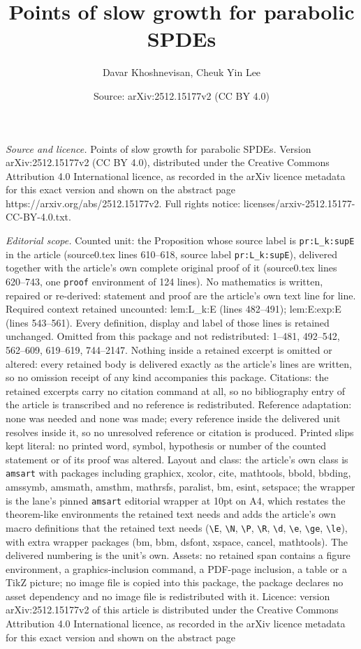 \documentclass[10pt,a4paper]{amsart}
\title[Points of slow growth for parabolic SPDEs]{Points of slow growth for parabolic SPDEs}
\author{Davar Khoshnevisan, Cheuk Yin Lee}
\date{Source: arXiv:2512.15177v2 (CC BY 4.0)}
\begin{document}
\maketitle

\noindent\emph{Source and licence.} Points of slow growth for parabolic SPDEs. Version arXiv:2512.15177v2 (CC BY 4.0), distributed under the Creative Commons Attribution 4.0 International licence, as recorded in the arXiv licence metadata for this exact version and shown on the abstract page https://arxiv.org/abs/2512.15177v2. Full rights notice: licenses/arxiv-2512.15177-CC-BY-4.0.txt.\par\smallskip

\noindent\textit{Editorial scope.} Counted unit: the Proposition whose source label is \texttt{pr:L\_k:supE} in the article (source0.tex lines 610--618, source label \texttt{pr:L\_k:supE}), delivered together with the article's own complete original proof of it (source0.tex lines 620--743, one \texttt{proof} environment of 124 lines). No mathematics is written, repaired or re-derived: statement and proof are the article's own text line for line. Required context retained uncounted: lem:L\_k:E (lines 482--491); lem:E:exp:E (lines 543--561). Every definition, display and label of those lines is retained unchanged. Omitted from this package and not redistributed: 1--481, 492--542, 562--609, 619--619, 744--2147. Nothing inside a retained excerpt is omitted or altered: every retained body is delivered exactly as the article's lines are written, so no omission receipt of any kind accompanies this package. Citations: the retained excerpts carry no citation command at all, so no bibliography entry of the article is transcribed and no reference is redistributed. Reference adaptation: none was needed and none was made; every reference inside the delivered unit resolves inside it, so no unresolved reference or citation is produced. Printed slips kept literal: no printed word, symbol, hypothesis or number of the counted statement or of its proof was altered. Layout and class: the article's own class is \texttt{amsart} with packages including graphicx, xcolor, cite, mathtools, bbold, bbding, amssymb, amsmath, amsthm, mathrsfs, paralist, bm, esint, setspace; the wrapper is the lane's pinned \texttt{amsart} editorial wrapper at 10pt on A4, which restates the theorem-like environments the retained text needs and adds the article's own macro definitions that the retained text needs (\texttt{\textbackslash E}, \texttt{\textbackslash N}, \texttt{\textbackslash P}, \texttt{\textbackslash R}, \texttt{\textbackslash d}, \texttt{\textbackslash e}, \texttt{\textbackslash ge}, \texttt{\textbackslash le}), with extra wrapper packages (bm, bbm, dsfont, xspace, cancel, mathtools). The delivered numbering is the unit's own. Assets: no retained span contains a figure environment, a graphics-inclusion command, a PDF-page inclusion, a table or a TikZ picture; no image file is copied into this package, the package declares no asset dependency and no image file is redistributed with it. Licence: version arXiv:2512.15177v2 of this article is distributed under the Creative Commons Attribution 4.0 International licence, as recorded in the arXiv licence metadata for this exact version and shown on the abstract page 
\end{document}
